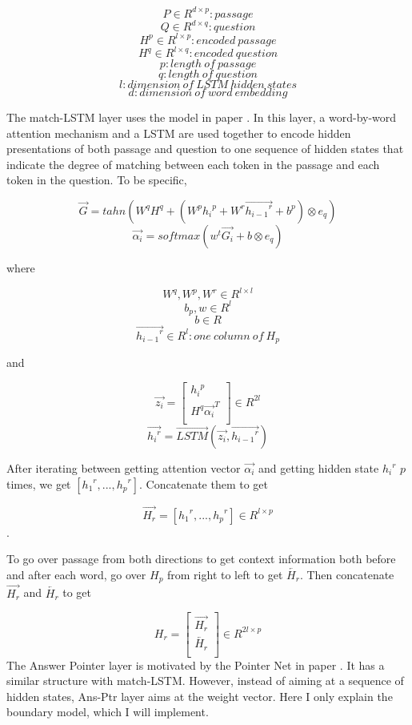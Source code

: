 \documentclass[12pt]{article}
\begin{document}
 $$P\in R^{d \times p}: passage$$
 $$Q\in R^{d \times q}: question$$
 $$H^p\in R^{l \times p}: encoded\ passage$$
 $$H^q\in R^{l \times q}: encoded\ question$$
 $$p: length \ of\ passage$$
 $$q: length\ of\ question$$
 $$l: dimension\ of\ LSTM\ hidden\ states$$
 $$d: dimension\ of\ word\ embedding$$

The match-LSTM layer uses the model in paper \cite{wang2015learning}. In this layer, a word-by-word attention mechanism and a LSTM are used together to encode hidden presentations of both passage and question to one sequence of hidden states that indicate the degree of matching between each token in the passage and each token in the question. To be specific,

$$\overrightarrow{G} = tahn(W^qH^q + (W^p{h_i}^p + W^r\overrightarrow{{h_{i-1}}^r} + b^p) \otimes e_q)$$
$$\overrightarrow{\alpha _i} = softmax(w^t\overrightarrow{G_i} + b \otimes e_q)$$


where

$$W^q, W^p, W^r\in R^{l \times l} $$
$$b_p, w\in R^{l}  $$
$$b \in R $$
$$\overrightarrow{{h_{i-1}}^r}\in R^{l}: one\ column\ of\ H_p  $$

and

\[ \overrightarrow{z_i} =
\begin{bmatrix}
{h_i}^p \\
H^q\overrightarrow{ {\alpha _i}}^T \\
\end{bmatrix}
\in R^{2l}
\]
$$\overrightarrow{{h_i}^r} = \overrightarrow{LSTM}(\overrightarrow{z_i}, \overrightarrow{{h_{i-1}}^r})$$

After iterating between getting attention vector $\overrightarrow{\alpha _i}$ and getting hidden state ${{h_{i}}^r}$ $p$ times, we get $[{{h_{1}}^r}, ..., {{h_{p}}^r}]$. Concatenate them to get

$$\overrightarrow{H_r} = [{{h_{1}}^r}, ..., {{h_{p}}^r}] \in R^{l \times p}$$.

To go over passage from both directions to get context information both before and after each word, go over $H_p$ from right to left to get $\overleftarrow{H_r}$. Then concatenate $\overrightarrow{H_r}$ and $\overleftarrow{H_r}$ to get

\[ H_r =
\begin{bmatrix}
\overrightarrow{H_r} \\
\overleftarrow{H_r} \\
\end{bmatrix}
\in R^{2l \times p}
\]
The Answer Pointer layer is motivated by the Pointer Net in paper \cite{vinyals2015pointer}. It has a similar structure with match-LSTM. However, instead of aiming at a sequence of hidden states, Ans-Ptr layer aims at the weight vector. Here I only explain the boundary model, which I will implement.
\end{document}

